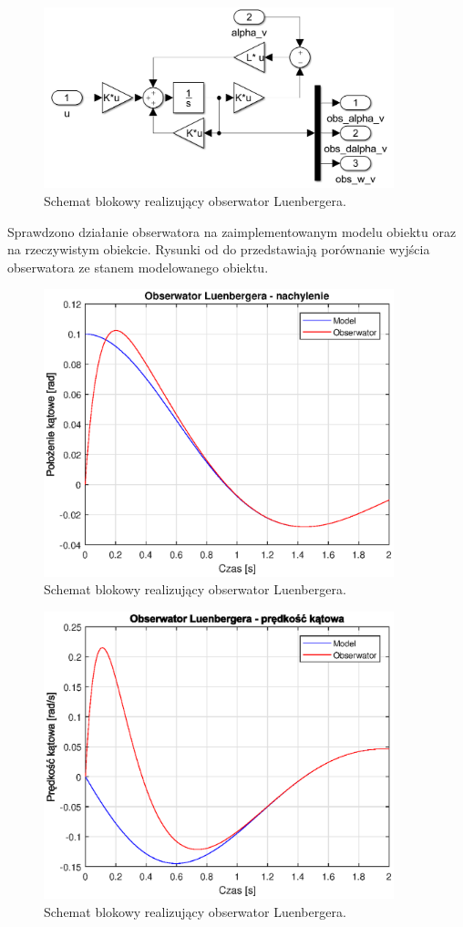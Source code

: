 \documentclass[11pt,a4paper]{article}
\begin{document}
\begin{figure}[H]
	\centering
	\includegraphics[width=4in]{Figures/Luenberger.png}
	\caption{Schemat blokowy realizujący obserwator Luenbergera.}
	\label{fig:Luenberger}
\end{figure}

Sprawdzono działanie obserwatora na zaimplementowanym modelu obiektu oraz na rzeczywistym obiekcie. Rysunki od do przedstawiają porównanie wyjścia obserwatora ze stanem modelowanego obiektu.

\begin{figure}[ht]
	\centering
	\includegraphics[width=4in]{Figures/obsv_alpha_v.eps}
	\caption{Schemat blokowy realizujący obserwator Luenbergera.}
	\label{fig:obsv_alpha_v}
\end{figure}

\begin{figure}[ht]
	\centering
	\includegraphics[width=4in]{Figures/obsv_dalpha_v.eps}
	\caption{Schemat blokowy realizujący obserwator Luenbergera.}
	\label{fig:obsv_dalpha_v}
\end{figure}
\end{document}
